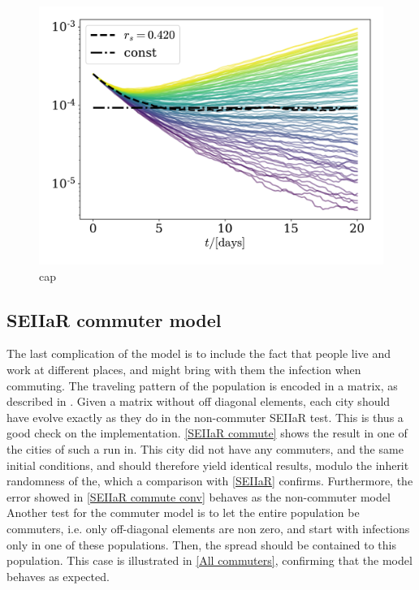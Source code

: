 \documentclass{article}
\begin{document}
    \begin{figure}[H]
        \centering
        \includegraphics[width=.7\textwidth]{../plots/2C/isolation.pdf}
        \caption{cap}
        \label{isolation}
    \end{figure}


    \subsection*{SEIIaR commuter model}
    The last complication of the model is to include the fact that people live and work at different places, and might bring with them the infection when commuting. 
    The traveling pattern of the population is encoded in a matrix, as described in \cite{exam}.
    Given a matrix without off diagonal elements, each city should have evolve exactly as they do in the non-commuter SEIIaR test.
    This is thus a good check on the implementation.
    \autoref{SEIIaR commute} shows the result in one of the cities of such a run in.
    This city did not have any commuters, and the same initial conditions, and should therefore yield identical results, modulo the inherit randomness of the, which a comparison with \autoref{SEIIaR} confirms.
    Furthermore, the error showed in \autoref{SEIIaR commute conv} behaves as the non-commuter model
    Another test for the commuter model is to let the entire population be commuters, i.e. only off-diagonal elements are non zero, and start with infections only in one of these populations.
    Then, the spread should be contained to this population.
    This case is illustrated in \autoref{All commuters}, confirming that the model behaves as expected.
\end{document}
